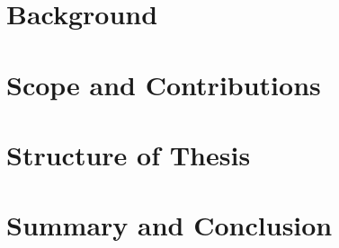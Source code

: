 
\section{Background}
\label{sec:Introduction:Background}


\section{Scope and Contributions}
\label{sec:Introduction:ScopeAndContributions}


\section{Structure of Thesis}
\label{sec:Introduction:StructureOfThesis}


\section{Summary and Conclusion}
\label{sec:Introduction:SummaryAndConclusion}
